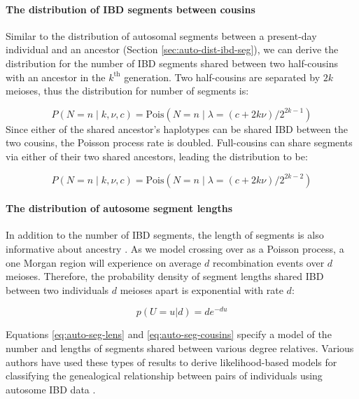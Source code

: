 \documentclass[9pt,twocolumn,twoside]{gsajnl}
\begin{document}
\paragraph{The distribution of IBD segments between cousins}

Similar to the distribution of autosomal segments between a present-day
individual and an ancestor (Section \ref{sec:auto-dist-ibd-seg}), we can derive
the distribution for the number of IBD segments shared between two half-cousins
with an ancestor in the $k^\text{th}$ generation. Two half-cousins are
separated by $2k$ meioses, thus the distribution for number of segments is:

\begin{equation} \label{eq:auto-seg-cousins}
 P(N=n \;|\; k, \nu, c) = \text{Pois}\left(N = n \;|\; \lambda=(c + 2 k \nu)/2^{2 k - 1} \right)
\end{equation}
%
Since either of the shared ancestor's haplotypes can be shared IBD between the
two cousins, the Poisson process rate is doubled. Full-cousins can share segments
via either of their two shared ancestors, leading the distribution to be:

\begin{equation}
  P(N=n \;|\; k, \nu, c) = \text{Pois}\left(N = n \;|\; \lambda=(c + 2 k \nu)/2^{2 k - 2} \right)
\end{equation}


\paragraph{The distribution of autosome segment lengths}

In addition to the number of IBD segments, the length of segments is also
informative about ancestry \citep[e.g.][]{palamara2012length}. As we model
crossing over as a Poisson process, a one Morgan region will experience on
average $d$ recombination events over $d$ meioses. Therefore, the probability
density of segment lengths shared IBD between two individuals $d$ meioses apart
is exponential with rate $d$:

\begin{equation}
  \label{eq:auto-seg-lens}
  p(U=u | d) = d e^{-du}
\end{equation}

Equations \eqref{eq:auto-seg-lens} and \eqref{eq:auto-seg-cousins} specify a
model of the number and lengths of segments shared between various degree
relatives. Various authors have used these types of results to derive
likelihood-based models for classifying the genealogical relationship between
pairs of individuals using autosome IBD data
\citep{Huff:2011eg,Henn:2012ij,Durand010512}. 
\end{document}
